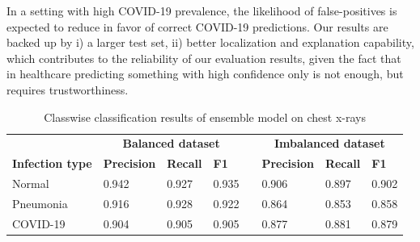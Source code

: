 \documentclass[conference]{IEEEtran}
\begin{document}
In a setting with high COVID-19 prevalence, the likelihood of false-positives is expected to reduce in favor of correct COVID-19 predictions. Our results are backed up by i) a larger test set, ii) better localization and explanation capability, which contributes to the reliability of our evaluation results, given the fact that in healthcare predicting something with high confidence only is not enough, but requires trustworthiness. 

\begin{table}
    \centering
	\caption{Classwise classification results of ensemble model on chest x-rays}
	\label{Table:class_specific_result}
	\begin{tabular}{p{3.2cm}p{1.7cm}p{1.1cm}p{1.3cm}p{0.1cm}p{1.7cm}p{1.2cm}p{1.0cm}}
		 & \multicolumn{3}{c}{\textbf{Balanced dataset}} && \multicolumn{3}{c}{\textbf{Imbalanced dataset}} \\	
		\cmidrule{2-4}\cmidrule{6-8}
		\textbf{Infection type} & \textbf{Precision} & \textbf{Recall}& \textbf{F1}&& \textbf{Precision} & \textbf{Recall}& \textbf{F1}\\	
		\hline
		Normal & 0.942 & 0.927 & 0.935 && 0.906 & 0.897 & 0.902\\
		Pneumonia & 0.916 & 0.928 & 0.922 && 0.864 & 0.853 & 0.858\\
		COVID-19 & 0.904 & 0.905 & 0.905 && 0.877 & 0.881 & 0.879\\
		\hline
	\end{tabular}
\end{table}
\end{document}
